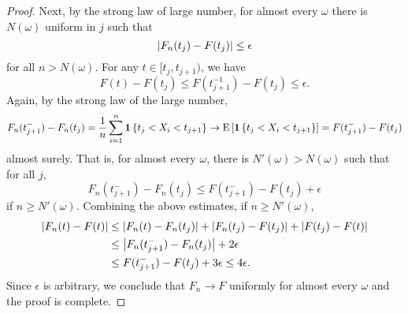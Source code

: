 \begin{proof}
    Next, by the strong law of large number, for almost every $\omega$ 
    there is $N(\omega)$ uniform in $j$ such that 
    \begin{equation*}
        \left\lvert {F_n(t_j) - F(t_j)} \right\rvert \leq \epsilon
    \end{equation*}
    for all $n>N(\omega)$. For any $t\in[t_j, t_{j+1})$, we have 
    \begin{equation*}
        F(t) - F(t_j) \leq F(t_{j+1}^{-1}) - F(t_j) \leq \epsilon. 
    \end{equation*}
    Again, by the strong law of the large number, 
    \begin{equation*}
        F_n(t_{j+1}^-) - F_n(t_j) = \frac{1}{n}\sum_{i=1}^n\mathbf{1}\left\{ {t_j < X_i < t_{j+1}} \right\}
        \to \operatorname{E}\left[ {\mathbf{1}\left\{ {t_j < X_i < t_{j+1}} \right\}} \right] = F(t_{j+1}^-) - F(t_j)
    \end{equation*}
    almost surely. That is, for almost every $\omega$, there is $N'(\omega)>N(\omega)$ 
    such that for all $j$, 
    \begin{equation*}
        F_n(t_{j+1}^-) - F_n(t_j) \leq F(t_{j+1}^-) - F(t_j) + \epsilon
    \end{equation*}
    if $n\geq N'(\omega)$. Combining the above estimates, if $n\geq N'(\omega)$, 
    \begin{equation*}
        \begin{split}
            \left\lvert {F_n(t)-F(t)} \right\rvert &\leq \left\lvert {F_n(t) - F_n(t_j)} \right\rvert + \left\lvert {F_n(t_j) - F(t_j)} \right\rvert 
            + \left\lvert {F(t_j) - F(t)} \right\rvert \\
            &\leq \left\lvert {F_n(t_{j+1}^-) - F_n(t_j)} \right\rvert + 2\epsilon \\ 
            &\leq F(t_{j+1}^-) - F(t_j) + 3\epsilon \leq 4\epsilon. 
        \end{split}
    \end{equation*}
    Since $\epsilon$ is arbitrary, we conclude that $F_n\to F$ uniformly for 
    almost every $\omega$ and the proof is complete. 
\end{proof}

